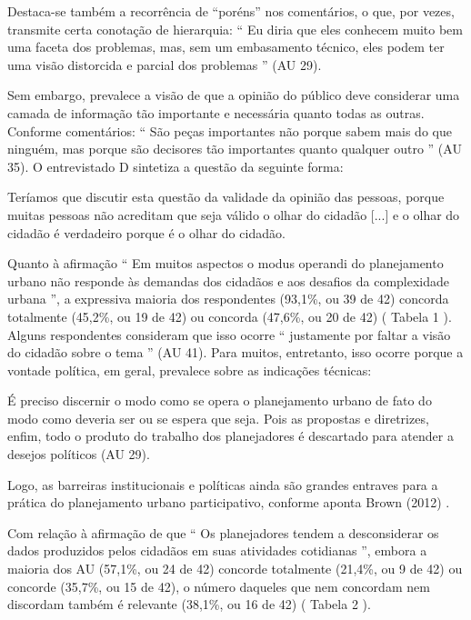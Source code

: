 \documentclass{article}
\begin{document}
Destaca-se também a recorrência de “poréns” nos comentários, o que, por vezes,
					transmite certa conotação de hierarquia: “%
Eu diria que eles conhecem
						muito bem uma faceta dos problemas, mas, sem um embasamento técnico, eles
						podem ter uma visão distorcida e parcial dos problemas%
” (AU
					29).

Sem embargo, prevalece a visão de que a opinião do público deve considerar uma
					camada de informação tão importante e necessária quanto todas as outras.
					Conforme comentários: “%
São peças importantes não porque sabem mais do
						que ninguém, mas porque são decisores tão importantes quanto qualquer
						outro%
” (AU 35). O entrevistado D sintetiza a questão da seguinte
					forma: 

Teríamos que discutir esta questão da validade da opinião das pessoas, porque
						muitas pessoas não acreditam que seja válido o olhar do cidadão
[...]%
 e o olhar do cidadão é verdadeiro porque é o
						olhar do cidadão.

Quanto à afirmação “%
Em muitos aspectos o modus operandi do planejamento
						urbano não responde às demandas dos cidadãos e aos desafios da complexidade
						urbana%
”, a expressiva maioria dos respondentes (93,1\%, ou 39 de 42)
					concorda totalmente (45,2\%, ou 19 de 42) ou concorda (47,6\%, ou 20 de 42) (%
Tabela 1%
). Alguns respondentes consideram
					que isso ocorre “%
justamente por faltar a visão do cidadão sobre o
						tema%
” (AU 41). Para muitos, entretanto, isso ocorre porque a
					vontade política, em geral, prevalece sobre as indicações técnicas: 

É preciso discernir o modo como se opera o planejamento urbano de fato do
						modo como deveria ser ou se espera que seja. Pois as propostas e diretrizes,
						enfim, todo o produto do trabalho dos planejadores é descartado para atender
						a desejos políticos %
(AU 29).%


Logo, as barreiras institucionais e políticas ainda são grandes entraves para a
					prática do planejamento urbano participativo, conforme aponta %
Brown (2012)%
.

Com relação à afirmação de que “%
Os planejadores tendem a desconsiderar os
						dados produzidos pelos cidadãos em suas atividades cotidianas%
”,
					embora a maioria dos AU (57,1\%, ou 24 de 42) concorde totalmente (21,4\%, ou 9 de
					42) ou concorde (35,7\%, ou 15 de 42), o número daqueles que nem concordam nem
					discordam também é relevante (38,1\%, ou 16 de 42) (%
Tabela 2%
).
\end{document}
